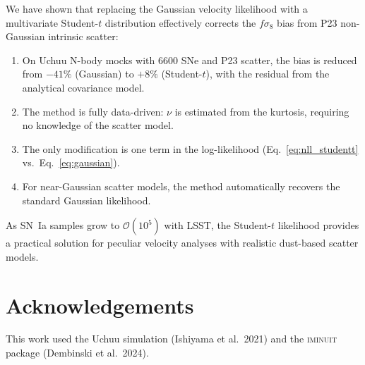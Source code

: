 \documentclass[fleqn,usenatbib]{mnras}
\begin{document}
We have shown that replacing the Gaussian velocity likelihood with
a multivariate Student-$t$ distribution effectively corrects the
$f\sigma_8$ bias from P23 non-Gaussian intrinsic scatter:

\begin{enumerate}
\item On Uchuu N-body mocks with 6600 SNe and P23 scatter, the
bias is reduced from $-41\%$ (Gaussian) to $+8\%$ (Student-$t$),
with the residual from the analytical covariance model.

\item The method is fully data-driven: $\nu$ is estimated from
the kurtosis, requiring no knowledge of the scatter model.

\item The only modification is one term in the log-likelihood
(Eq.~\ref{eq:nll_studentt} vs.\ Eq.~\ref{eq:gaussian}).

\item For near-Gaussian scatter models, the method automatically
recovers the standard Gaussian likelihood.
\end{enumerate}

As SN~Ia samples grow to $\mathcal{O}(10^5)$ with LSST, the
Student-$t$ likelihood provides a practical solution for peculiar
velocity analyses with realistic dust-based scatter models.

\section*{Acknowledgements}
This work used the Uchuu simulation (Ishiyama et al.\ 2021) and
the \textsc{iminuit} package (Dembinski et al.\ 2024).
\end{document}

